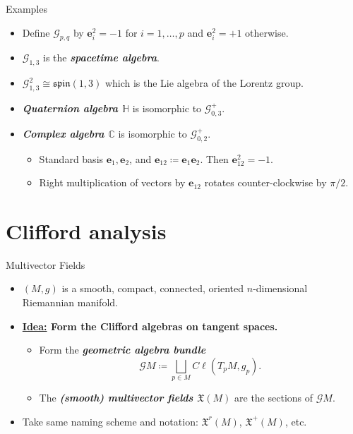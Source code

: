 \documentclass[aspectratio=169]{beamer}
\newcommand\boldgreen[1]{\textcolor{lighter_csu_green}{\emph{\textbf{#1}}}}
\newcommand\boldgold[1]{\textcolor{csu_gold}{\textbf{#1}}}
\newcommand{\C}{\mathbb{C}}
\newcommand{\G}{\mathcal{G}}
\newcommand{\blade}[1]{\boldsymbol{#1}}
\newcommand{\smoothfields}{\mathfrak{X}}
\begin{document}
\begin{frame}{Examples}
\vfill
\begin{itemize}
\pause
\item Define $\G_{p,q}$ by $\blade{e}_i^2=-1$ for $i=1,\dots,p$ and $\blade{e}_i^2=+1$ otherwise.
\pause
\item $\G_{1,3}$ is the \boldgreen{spacetime algebra}.
\pause
\item $\G_{1,3}^2 \cong \mathfrak{spin}(1,3)$ which is the Lie algebra of the Lorentz group.
\pause
\item \boldgreen{Quaternion algebra $\mathbb{H}$} is isomorphic to $\G_{0,3}^+$.
\pause
\item \boldgreen{Complex algebra $\C$} is isomorphic to $\G_{0,2}^+$.
\begin{itemize}
\pause
\item Standard basis $\blade{e}_1,\blade{e}_2$, and $\blade{e}_{12}\coloneqq \blade{e}_1\blade{e}_2$. Then $\blade{e}_{12}^2 = -1$.
\pause
\item Right multiplication of vectors by $\blade{e}_{12}$ rotates counter-clockwise by $\pi/2$.
\end{itemize}
\end{itemize}
\vfill
\end{frame}

\section{Clifford analysis}

\begin{frame}{Multivector Fields}
\vfill
\begin{itemize}
\pause
\item $(M,g)$ is a smooth, compact, connected, oriented $n$-dimensional Riemannian manifold.
\pause
\item \noindent\boldgold{{\underline{Idea:}} Form the Clifford algebras on tangent spaces.}
    \begin{itemize}
        \pause
        \item Form the \boldgreen{geometric algebra bundle}
        \[
        \G M \coloneqq \bigsqcup_{p\in M} C\ell(T_pM,g_p).
        \]
        \pause
        \item The \boldgreen{(smooth) multivector fields $\smoothfields(M)$} are the sections of $\G M$.
    \end{itemize}
    \pause
    \item Take same naming scheme and notation: $\smoothfields^r(M)$, $\smoothfields^+(M)$, etc.
\end{itemize}
\vfill
\end{frame}
\end{document}
